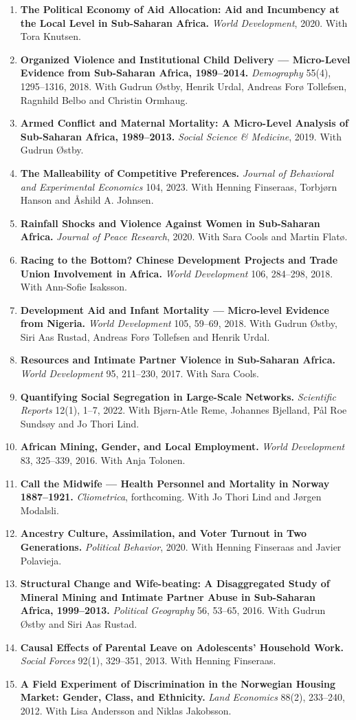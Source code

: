 \documentclass[11pt]{article}
\newcommand{\pub}[2]{\item \textbf{#1} #2}
\begin{document}
\begin{enumerate}
\pub{The Political Economy of Aid Allocation: Aid and Incumbency at the Local Level in Sub-Saharan Africa.}{\textit{World Development}, 2020. With Tora Knutsen.}
\pub{Organized Violence and Institutional Child Delivery --- Micro-Level Evidence from Sub-Saharan Africa, 1989--2014.}{\textit{Demography} 55(4), 1295--1316, 2018. With Gudrun Østby, Henrik Urdal, Andreas Forø Tollefsen, Ragnhild Belbo and Christin Ormhaug.}
\pub{Armed Conflict and Maternal Mortality: A Micro-Level Analysis of Sub-Saharan Africa, 1989--2013.}{\textit{Social Science \& Medicine}, 2019. With Gudrun Østby.}
\pub{The Malleability of Competitive Preferences.}{\textit{Journal of Behavioral and Experimental Economics} 104, 2023. With Henning Finseraas, Torbjørn Hanson and Åshild A. Johnsen.}
\pub{Rainfall Shocks and Violence Against Women in Sub-Saharan Africa.}{\textit{Journal of Peace Research}, 2020. With Sara Cools and Martin Flatø.}
\pub{Racing to the Bottom? Chinese Development Projects and Trade Union Involvement in Africa.}{\textit{World Development} 106, 284--298, 2018. With Ann-Sofie Isaksson.}
\pub{Development Aid and Infant Mortality --- Micro-level Evidence from Nigeria.}{\textit{World Development} 105, 59--69, 2018. With Gudrun Østby, Siri Aas Rustad, Andreas Forø Tollefsen and Henrik Urdal.}
\pub{Resources and Intimate Partner Violence in Sub-Saharan Africa.}{\textit{World Development} 95, 211--230, 2017. With Sara Cools.}
\pub{Quantifying Social Segregation in Large-Scale Networks.}{\textit{Scientific Reports} 12(1), 1--7, 2022. With Bjørn-Atle Reme, Johannes Bjelland, Pål Roe Sundsøy and Jo Thori Lind.}
\pub{African Mining, Gender, and Local Employment.}{\textit{World Development} 83, 325--339, 2016. With Anja Tolonen.}
\pub{Call the Midwife --- Health Personnel and Mortality in Norway 1887--1921.}{\textit{Cliometrica}, forthcoming. With Jo Thori Lind and Jørgen Modalsli.}
\pub{Ancestry Culture, Assimilation, and Voter Turnout in Two Generations.}{\textit{Political Behavior}, 2020. With Henning Finseraas and Javier Polavieja.}
\pub{Structural Change and Wife-beating: A Disaggregated Study of Mineral Mining and Intimate Partner Abuse in Sub-Saharan Africa, 1999--2013.}{\textit{Political Geography} 56, 53--65, 2016. With Gudrun Østby and Siri Aas Rustad.}
\pub{Causal Effects of Parental Leave on Adolescents' Household Work.}{\textit{Social Forces} 92(1), 329--351, 2013. With Henning Finseraas.}
\pub{A Field Experiment of Discrimination in the Norwegian Housing Market: Gender, Class, and Ethnicity.}{\textit{Land Economics} 88(2), 233--240, 2012. With Lisa Andersson and Niklas Jakobsson.}

\end{enumerate}
\end{document}
